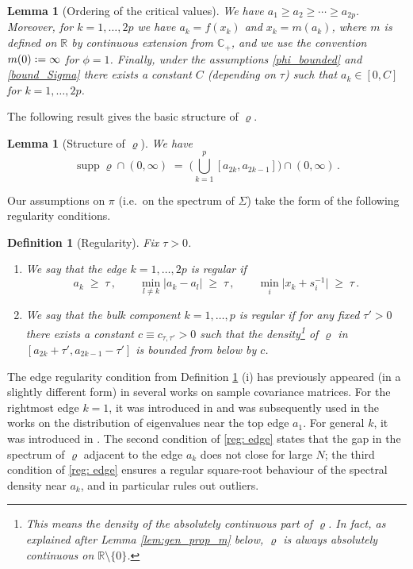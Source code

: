 \documentclass[11pt]{article} %
\numberwithin{equation}{section}
\numberwithin{figure}{section}
\theoremstyle{plain} %
\newtheorem{lemma}[theorem]{Lemma}
\newtheorem{definition}[theorem]{Definition}
\theoremstyle{definition} %
\newcommand{\R}{\mathbb{R}}
\newcommand{\C}{\mathbb{C}}
\newcommand*{\deq}{\mathrel{\vcenter{\baselineskip0.65ex \lineskiplimit0pt \hbox{.}\hbox{.}}}=}
\renewcommand{\geq}{\geqslant}
\newcommand{\pBB}[1]{\Biggl({#1}\Biggr)}
\newcommand{\abs}[1]{\lvert #1 \rvert}
\DeclareMathOperator{\supp}{supp}
\begin{document}
\begin{lemma}[Ordering of the critical values] \label{lem:a_order}
We have $a_1 \geq a_2 \geq \cdots \geq a_{2p}$. Moreover, for $k = 1, \dots, 2p$ we have $a_k = f(x_k)$ and $x_k = m(a_k)$, where $m$ is defined on $\R$ by continuous extension from $\C_+$, and we use the convention $m(0) \deq \infty$ for $\phi = 1$.
Finally, under the assumptions \eqref{phi_bounded} and \eqref{bound_Sigma} there exists a constant $C$ (depending on $\tau$) such that $a_k \in [0,C]$ for $k = 1, \dots, 2p$.
\end{lemma}

The following result gives the basic structure of $\varrho$.
\begin{lemma}[Structure of $\varrho$] \label{lem:rho_struct}
We have
\begin{equation} \label{rho_supp}
\supp \varrho \cap (0,\infty)\;=\; \pBB{\bigcup_{k = 1}^p [a_{2k}, a_{2k - 1}]} \cap (0,\infty)\,.
\end{equation}
\end{lemma}


Our assumptions on $\pi$ (i.e.\ on the spectrum of $\Sigma$) take the form of the following regularity conditions.


\begin{definition}[Regularity] \label{def:regular}
Fix $\tau > 0$.
\begin{enumerate}
\item
We say that the edge $k = 1, \dots, 2p$ is \emph{regular} if
\begin{equation} \label{reg: edge}
a_k \;\geq\; \tau \,, \qquad \min_{l \neq k} \abs{a_k - a_l} \;\geq\; \tau\,, \qquad \min_{i} \abs{x_k + s_i^{-1}} \;\geq\; \tau\,.
\end{equation}
\item
We say that the bulk component $k = 1, \dots, p$ is \emph{regular} if for any fixed $\tau' > 0$ there exists a constant $c \equiv c_{\tau, \tau'} > 0$ such that the density\footnote{This means the density of the absolutely continuous part of $\varrho$. In fact, as explained after Lemma \ref{lem:gen_prop_m} below, $\varrho$ is always absolutely continuous on $\R \setminus \{0\}$.} of $\varrho$ in $[a_{2k} + \tau', a_{2k - 1} - \tau']$ is bounded from below by $c$.
\end{enumerate}
\end{definition}

The edge regularity condition from Definition \ref{def:regular} (i) has previously appeared (in a slightly different form) in several works on sample covariance matrices. For the rightmost edge $k = 1$, it was introduced in \cite{ElK2} and was subsequently used in the works \cite{SL, Ona, BaoPanZhou} on the distribution of eigenvalues near the top edge $a_1$. For general $k$, it was introduced in \cite{HHN}. The second condition of \eqref{reg: edge} states that the gap in the spectrum of $\varrho$ adjacent to the edge $a_k$ does not close for large $N$; the third condition of \eqref{reg: edge} ensures a regular square-root behaviour of the spectral density near $a_k$, and in particular rules out outliers.
\end{document}
